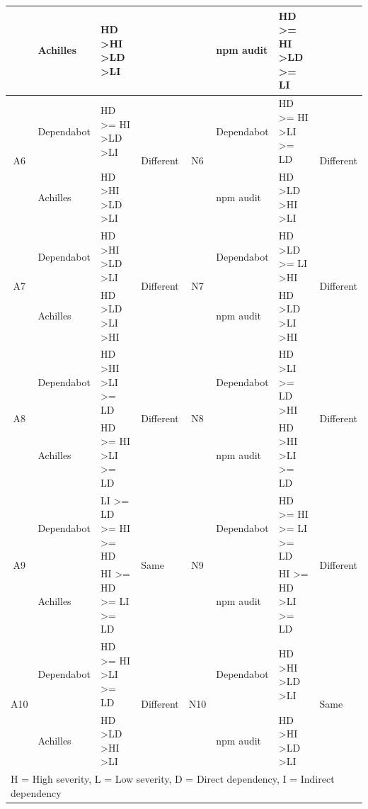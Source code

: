\documentclass[conference]{IEEEtran}
\begin{document}
\begin{table}[tb]
\begin{tabular}{clll|clll}
			& Achilles   & HD \textgreater HI \textgreater LD \textgreater LI & & & npm audit & HD \textgreater{}= HI \textgreater LD \textgreater{}= LI  & \\ 
			\midrule
			\multirow{2}{*}{A6}  & Dependabot & HD \textgreater{}= HI \textgreater LD \textgreater LI       & \multirow{2}{*}{Different}      & \multirow{2}{*}{N6} & Dependabot & HD \textgreater{}= HI \textgreater LI \textgreater{}= LD & \multirow{2}{*}{Different} \\ 
			& Achilles   & HD \textgreater HI \textgreater LD \textgreater LI & & & npm audit & HD \textgreater LD \textgreater HI \textgreater LI & \\ 
			\midrule
			\multirow{2}{*}{A7}  & Dependabot & HD \textgreater HI \textgreater LD \textgreater LI & \multirow{2}{*}{Different}      & \multirow{2}{*}{N7} & Dependabot & HD \textgreater LD \textgreater{}= LI \textgreater HI & \multirow{2}{*}{Different} \\  
			& Achilles   & HD \textgreater LD \textgreater LI \textgreater HI & & & npm audit & HD \textgreater LD \textgreater LI \textgreater HI &  \\ 
			\midrule
			\multirow{2}{*}{A8}  & Dependabot & HD \textgreater HI \textgreater LI \textgreater{}= LD       & \multirow{2}{*}{Different}      & \multirow{2}{*}{N8} & Dependabot & HD \textgreater LI \textgreater{}= LD \textgreater HI & \multirow{2}{*}{Different} \\ 
			& Achilles   & HD \textgreater{}= HI \textgreater LI \textgreater{}= LD    &                                 & & npm audit & HD \textgreater HI \textgreater LI \textgreater{}= LD & \\ 
			\midrule
			\multirow{2}{*}{A9}  & Dependabot & LI \textgreater{}= LD \textgreater{}= HI \textgreater{}= HD & \multirow{2}{*}{Same}           & \multirow{2}{*}{N9} & Dependabot & HD \textgreater{}= HI \textgreater{}= LI \textgreater{}= LD & \multirow{2}{*}{Different} \\ 
			& Achilles   & HI \textgreater{}= HD \textgreater{}= LI \textgreater{}= LD &                                 & & npm audit & HI \textgreater{}= HD \textgreater LI \textgreater{}= LD &  \\ 
			\midrule
			\multirow{2}{*}{A10} & Dependabot & HD \textgreater{}= HI \textgreater LI \textgreater{}= LD    & \multirow{2}{*}{Different}      & \multirow{2}{*}{N10} & Dependabot & HD \textgreater HI \textgreater LD \textgreater LI & \multirow{2}{*}{Same} \\ 
			& Achilles   & HD \textgreater LD \textgreater HI \textgreater LI          &                                 & & npm audit & HD \textgreater HI \textgreater LD \textgreater LI & \\ 
			\bottomrule
			\multicolumn{8}{l}{H = High severity, L = Low severity, D = Direct dependency, I = Indirect dependency} \\
		\end{tabular}
		\label{table:ach-indirect}
	\end{table}
	
\end{document}

